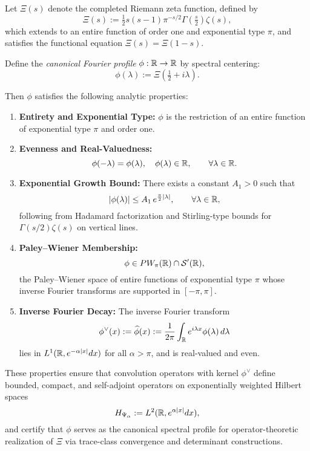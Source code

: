 \begin{definition}
\label{def:canonical_fourier_profile}
Let \( \Xi(s) \) denote the completed Riemann zeta function, defined by
\[
\Xi(s) := \tfrac{1}{2} s(s-1) \pi^{-s/2} \Gamma\left(\tfrac{s}{2}\right) \zeta(s),
\]
which extends to an entire function of order one and exponential type \( \pi \), and satisfies the functional equation \( \Xi(s) = \Xi(1 - s) \).

Define the \emph{canonical Fourier profile} \( \phi : \mathbb{R} \to \mathbb{R} \) by spectral centering:
\[
\phi(\lambda) := \Xi\left( \tfrac{1}{2} + i\lambda \right).
\]

Then \( \phi \) satisfies the following analytic properties:

\begin{enumerate}
  \item \textbf{Entirety and Exponential Type:} \( \phi \) is the restriction of an entire function of exponential type \( \pi \) and order one.

  \item \textbf{Evenness and Real-Valuedness:}
  \[
  \phi(-\lambda) = \phi(\lambda), \quad \phi(\lambda) \in \mathbb{R}, \qquad \forall \lambda \in \mathbb{R}.
  \]

  \item \textbf{Exponential Growth Bound:} There exists a constant \( A_1 > 0 \) such that
  \[
  |\phi(\lambda)| \le A_1\, e^{\frac{\pi}{2} |\lambda|}, \qquad \forall \lambda \in \mathbb{R},
  \]
  following from Hadamard factorization and Stirling-type bounds for \( \Gamma(s/2)\zeta(s) \) on vertical lines.

  \item \textbf{Paley--Wiener Membership:}
  \[
  \phi \in PW_\pi(\mathbb{R}) \cap \mathcal{S}'(\mathbb{R}),
  \]
  the Paley--Wiener space of entire functions of exponential type \( \pi \) whose inverse Fourier transforms are supported in \( [-\pi, \pi] \).

  \item \textbf{Inverse Fourier Decay:} The inverse Fourier transform
  \[
  \phi^\vee(x) := \widehat{\phi}(x) := \frac{1}{2\pi} \int_{\mathbb{R}} e^{i \lambda x} \phi(\lambda)\, d\lambda
  \]
  lies in \( L^1(\mathbb{R}, e^{-\alpha |x|} dx) \) for all \( \alpha > \pi \), and is real-valued and even.
\end{enumerate}

\noindent
These properties ensure that convolution operators with kernel \( \phi^\vee \) define bounded, compact, and self-adjoint operators on exponentially weighted Hilbert spaces
\[
H_{\Psi_\alpha} := L^2(\mathbb{R}, e^{\alpha |x|} dx),
\]
and certify that \( \phi \) serves as the canonical spectral profile for operator-theoretic realization of \( \Xi \) via trace-class convergence and determinant constructions.
\end{definition}
